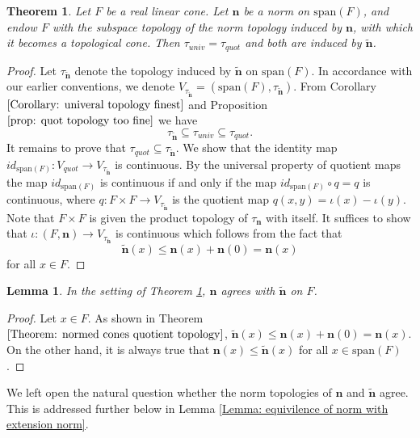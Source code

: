 \documentclass[a4paper,11pt]{article}
\numberwithin{equation}{section}
\theoremstyle{definition}
\theoremstyle{plain}
\newtheorem{Theorem}[Definition]{Theorem}
\newtheorem{Lemma}[Definition]{Lemma}
\newcommand{\spn}{\mathrm{span}}
\begin{document}
\begin{Theorem}\label{Theorem: normed cones quotient topology}
    Let $F$ be a real linear cone. Let $\mathbf n$ be a norm on $\spn(F)$, and endow $F$ with the subspace topology of the norm topology induced by $\mathbf n$, with which it becomes a topological cone. Then $\tau_{univ} = \tau_{quot}$ and both are induced by $\tilde{\mathbf{n}}$.
\end{Theorem}
\begin{proof}
    Let $\tau_{\tilde{\mathbf{n}}}$ denote the topology induced by $\tilde{\mathbf{n}}$ on $\spn(F)$. In accordance with our earlier conventions, we denote $V_{\tau_{\tilde{\mathbf{n}}}} = (\spn(F), \tau_{\tilde{\mathbf{n}}})$. From Corollary $\ref{Corollary: univeral topology finest}$ and Proposition $\ref{prop: quot topology too fine}$ we have
    $$\tau_{\tilde{\mathbf{n}}} \subseteq \tau_{univ} \subseteq \tau_{quot}.$$
    It remains to prove that $\tau_{quot} \subseteq \tau_{\tilde{\mathbf{n}}}$. We show that the identity map $id_{\spn(F)}: V_{quot} \longrightarrow V_{\tau_{\tilde{\mathbf{n}}}}$ is continuous. By the universal property of quotient maps the map $id_{\spn(F)}$ is continuous if and only if the map $id_{\spn(F)} \circ q = q$ is continuous, where $q: F \times F \longrightarrow V_{\tau_{\tilde{\mathbf{n}}}}$ is the quotient map $q(x, y) = \iota(x) - \iota(y)$. Note that $F \times F$ is given the product topology of $\tau_{\mathbf{n}}$ with itself. It suffices to show that $\iota: (F, \mathbf{n}) \longrightarrow V_{\tau_{\tilde{\mathbf{n}}}}$ is continuous which follows from the fact that
    $$\tilde{\mathbf{n}}(x) \leq \mathbf{n}(x) + \mathbf{n}(0) = \mathbf{n}(x)$$
    for all $x \in F$.
\end{proof}

\begin{Lemma}\label{Lemma: monotone norm implies norm can be extended}
    In the setting of Theorem \ref{Theorem: normed cones quotient topology}, $\mathbf{n}$ agrees with $\tilde{\mathbf{n}}$ on $F$.
\end{Lemma}
\begin{proof}
    Let $x \in F$. As shown in Theorem $\ref{Theorem: normed cones quotient topology}$, $\tilde{\mathbf{n}}(x) \leq \mathbf{n}(x) + \mathbf{n}(0) = \mathbf{n}(x)$. On the other hand, it is always true that $\mathbf n(x) \leq \mathbf{\tilde{n}}(x)$ for all $x \in \spn(F)$.
\end{proof}

We left open the natural question whether the norm topologies of $\mathbf n$ and $\mathbf{\tilde{n}}$ agree. This is addressed further below in Lemma \ref{Lemma: equivilence of norm with extension norm}.
\end{document}
